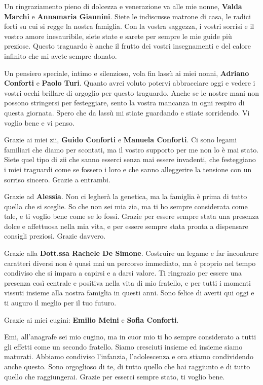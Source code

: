 Un ringraziamento pieno di dolcezza e venerazione va alle mie nonne, \textbf{Valda Marchi} e \textbf{Annamaria Giannini}. Siete le indiscusse matrone di casa, le radici forti su cui si regge la nostra famiglia. Con la vostra saggezza, i vostri sorrisi e il vostro amore inesauribile, siete state e sarete per sempre le mie guide più preziose. Questo traguardo è anche il frutto dei vostri insegnamenti e del calore infinito che mi avete sempre donato.

Un pensiero speciale, intimo e silenzioso, vola fin lassù ai miei nonni, \textbf{Adriano Conforti} e \textbf{Paolo Turi}. Quanto avrei voluto potervi abbracciare oggi e vedere i vostri occhi brillare di orgoglio per questo traguardo. Anche se le nostre mani non possono stringersi per festeggiare, sento la vostra mancanza in ogni respiro di questa giornata. Spero che da lassù mi stiate guardando e stiate sorridendo. Vi voglio bene e vi penso.

Grazie ai miei zii, \textbf{Guido Conforti} e \textbf{Manuela Conforti}. 
Ci sono legami familiari che diamo per scontati, ma il vostro supporto per me non lo è mai stato. Siete quel tipo di zii che sanno esserci senza mai essere invadenti, che festeggiano i miei traguardi come se fossero i loro e che sanno alleggerire la tensione con un sorriso sincero. Grazie a entrambi.

Grazie ad \textbf{Alessia}. 
Non ci legherà la genetica, ma la famiglia è prima di tutto quella che si sceglie. So che non sei mia zia, ma ti ho sempre considerata come tale, e ti voglio bene come se lo fossi. Grazie per essere sempre stata una presenza dolce e affettuosa nella mia vita, e per essere sempre stata pronta a dispensare consigli preziosi. Grazie davvero.

Grazie alla \textbf{Dott.ssa Rachele De Simone}.
Costruire un legame e far incontrare caratteri diversi non è quasi mai un percorso immediato, ma è proprio nel tempo condiviso che si impara a capirsi e a darsi valore. Ti ringrazio per essere una presenza così centrale e positiva nella vita di mio fratello, e per tutti i momenti vissuti insieme alla nostra famiglia in questi anni. Sono felice di averti qui oggi e ti auguro il meglio per il tuo futuro.

Grazie ai miei cugini: \textbf{Emilio Meini} e \textbf{Sofia Conforti}. 

Emi, all'anagrafe sei mio cugino, ma in cuor mio ti ho sempre considerato a tutti gli effetti come un secondo fratello. Siamo cresciuti insieme ed insieme siamo maturati. Abbiamo condiviso l'infanzia, l'adolescenza e ora stiamo condividendo anche questo. Sono orgoglioso di te, di tutto quello che hai raggiunto e di tutto quello che raggiungerai. Grazie per esserci sempre stato, ti voglio bene.

